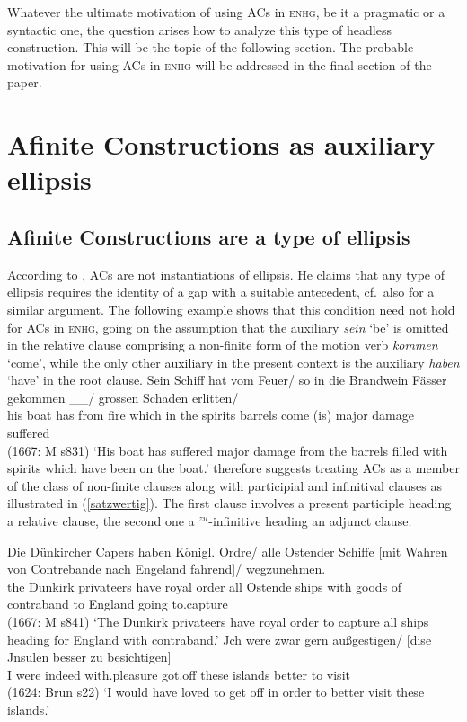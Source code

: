 \documentclass[output=paper,colorlinks,citecolor=brown]{langscibook}
\begin{document}
\noindent
Whatever the ultimate motivation of using ACs in \textsc{enhg}, be it a pragmatic or a syntactic one, the question arises how to analyze this type of headless construction. This will be the topic of the following section. The probable motivation for using ACs in \textsc{enhg} will be addressed in the final section of the paper.

\section{Afinite Constructions as auxiliary ellipsis \label{analysis}}

\subsection{Afinite Constructions are a type of ellipsis \label{arg_ellipsis}}

\largerpage[2]
According to \citet{schroeder85}, ACs are not instantiations of ellipsis. He claims that any type of ellipsis requires the identity of a gap with a suitable antecedent, cf.\ also \citet{biener25} for a similar argument. The following example shows that this condition need not hold for ACs in \textsc{enhg}, going on the assumption that the auxiliary \textit{sein} `be' is omitted in the relative clause comprising a non-finite form of the motion verb \textit{kommen} `come', while the only other auxiliary in the present context is the auxiliary \textit{haben} `have' in the root clause. 
\ea \label{AC}
\gll Sein Schiff hat vom Feuer/ so in die Brandwein Fässer gekommen \_\_/ grossen Schaden erlitten/ \\ his boat has from fire which in the spirits barrels come (is) major damage suffered \\ \hfill (1667: M s831)
\glt `His boat has suffered major damage from the barrels filled with spirits which have been on the boat.'
\z
\citet{schroeder85} therefore suggests treating ACs as a member of the class of non-finite clauses
along with participial and infinitival clauses as illustrated in (\ref{satzwertig}). The first
clause involves a present participle heading a relative clause, the second one a $^{zu}$-infinitive
heading an adjunct clause.

\eal \label{satzwertig}
\ex
\gll Die Dünkircher Capers haben Königl. Ordre/ alle Ostender Schiffe [mit Wahren von Contrebande nach Engeland fahrend]/
wegzunehmen.  \\ 
     the Dunkirk privateers have royal order all Ostende ships with goods of contraband to England going to.capture \\  \hfill (1667: M s841)
\glt `The Dunkirk privateers have royal order to capture all ships heading for England with contraband.'
\ex
\gll Jch were zwar gern außgestigen/ [dise Jnsulen besser zu besichtigen] \\ I were indeed with.pleasure got.off these islands better to visit    \\ \hfill (1624: Brun s22)
\glt `I would have loved to get off in order to better visit these islands.'
\zl
\end{document}
